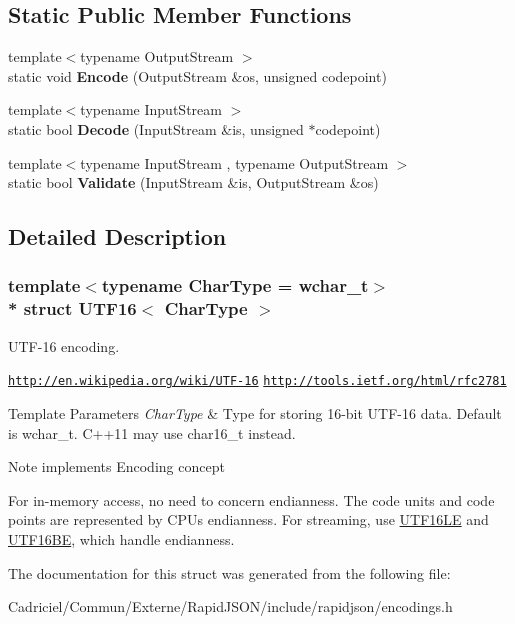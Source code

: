 \subsection*{Static Public Member Functions}
\begin{DoxyCompactItemize}
\item 
{\footnotesize template$<$typename Output\+Stream $>$ }\\static void {\bfseries Encode} (Output\+Stream \&os, unsigned codepoint)\hypertarget{struct_u_t_f16_a9d8ded01244e30d037c4afa10ee2b30e}{}\label{struct_u_t_f16_a9d8ded01244e30d037c4afa10ee2b30e}

\item 
{\footnotesize template$<$typename Input\+Stream $>$ }\\static bool {\bfseries Decode} (Input\+Stream \&is, unsigned $\ast$codepoint)\hypertarget{struct_u_t_f16_a124c79dfd9f9b4c3fb65bd55ba17b4be}{}\label{struct_u_t_f16_a124c79dfd9f9b4c3fb65bd55ba17b4be}

\item 
{\footnotesize template$<$typename Input\+Stream , typename Output\+Stream $>$ }\\static bool {\bfseries Validate} (Input\+Stream \&is, Output\+Stream \&os)\hypertarget{struct_u_t_f16_a7516184ed5dce10c0e7895bec124d97d}{}\label{struct_u_t_f16_a7516184ed5dce10c0e7895bec124d97d}

\end{DoxyCompactItemize}


\subsection{Detailed Description}
\subsubsection*{template$<$typename Char\+Type = wchar\+\_\+t$>$\\*
struct U\+T\+F16$<$ Char\+Type $>$}

U\+T\+F-\/16 encoding. 

\href{http://en.wikipedia.org/wiki/UTF-16}{\tt http\+://en.\+wikipedia.\+org/wiki/\+U\+T\+F-\/16} \href{http://tools.ietf.org/html/rfc2781}{\tt http\+://tools.\+ietf.\+org/html/rfc2781} 
\begin{DoxyTemplParams}{Template Parameters}
{\em Char\+Type} & Type for storing 16-\/bit U\+T\+F-\/16 data. Default is wchar\+\_\+t. C++11 may use char16\+\_\+t instead. \\
\hline
\end{DoxyTemplParams}
\begin{DoxyNote}{Note}
implements Encoding concept

For in-\/memory access, no need to concern endianness. The code units and code points are represented by C\+PU\textquotesingle{}s endianness. For streaming, use \hyperlink{struct_u_t_f16_l_e}{U\+T\+F16\+LE} and \hyperlink{struct_u_t_f16_b_e}{U\+T\+F16\+BE}, which handle endianness. 
\end{DoxyNote}


The documentation for this struct was generated from the following file\+:\begin{DoxyCompactItemize}
\item 
Cadriciel/\+Commun/\+Externe/\+Rapid\+J\+S\+O\+N/include/rapidjson/encodings.\+h\end{DoxyCompactItemize}
